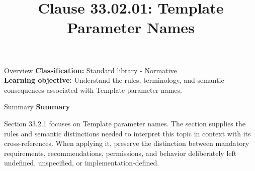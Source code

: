 \documentclass[10pt,letterpaper]{article}
\title{Clause 33.02.01: Template Parameter Names}
\author{}
\date{}
\begin{document}
\maketitle
\begin{CornellOverviewBox}{Overview}
\textbf{Classification:} Standard library - Normative\\[2pt]
\textbf{Learning objective:} Understand the rules, terminology, and semantic consequences associated with Template parameter names.
\end{CornellOverviewBox}\begin{CornellSummaryBox}{Summary}
{\sffamily\bfseries\color{Accent} Summary}\par\vspace{3pt}Section 33.2.1 focuses on Template parameter names. The section supplies the rules and semantic distinctions needed to interpret this topic in context with its cross-references. When applying it, preserve the distinction between mandatory requirements, recommendations, permissions, and behavior deliberately left undefined, unspecified, or implementation-defined.
\end{CornellSummaryBox}
\end{document}
